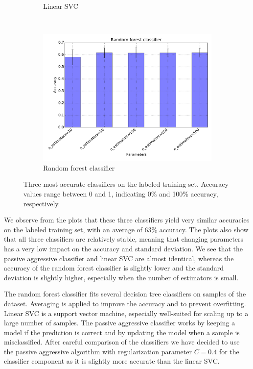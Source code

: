 \documentclass{article}
\begin{document}
\begin{figure}[h!]
\begin{subfigure}{.48\textwidth}
    \caption{Linear SVC}\label{fig:classifiers-linear-svc}
  \end{subfigure} \\
  \vspace{0.5cm}
  \begin{subfigure}{.48\textwidth}
    \centering
    \includegraphics[width=\textwidth]{Images/Random_forest.pdf}
    \caption{Random forest classifier}\label{fig:classifiers-random-forest}
  \end{subfigure}
  \caption{Three most accurate classifiers on the labeled training set. Accuracy
           values range between 0 and 1, indicating 0\% and 100\% accuracy, respectively.}\label{fig:classifiers}
\end{figure}

We observe from the plots that these three classifiers yield very similar
accuracies on the labeled training set, with an average of 63\% accuracy.
The plots also show that all three classifiers are relatively stable,
meaning that changing parameters has a very low impact on the accuracy
and standard deviation. We see that the passive aggressive classifier and
linear SVC are almost identical, whereas the accuracy of the random forest
classifier is slightly lower and the standard deviation is slightly higher,
especially when the number of estimators is small.

The random forest classifier fits several decision tree classifiers on
samples of the dataset. Averaging is applied to improve the accuracy and
to prevent overfitting. Linear SVC is a support vector machine, especially
well-suited for scaling up to a large number of samples. The passive
aggressive classifier works by keeping a model if the prediction is correct
and by updating the model when a sample is misclassified. After careful
comparison of the classifiers we have decided to use the passive aggressive
algorithm with regularization parameter $C = 0.4$ for the classifier
component as it is slightly more accurate than the linear SVC.
\end{document}
